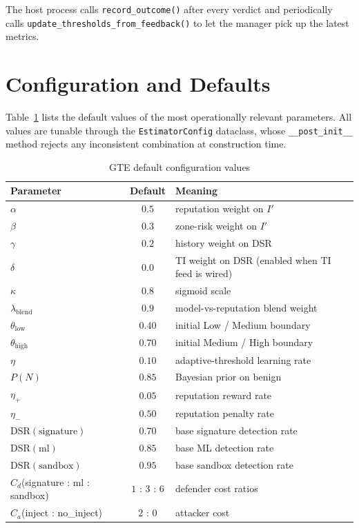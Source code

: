 \documentclass[12pt, a4paper]{report}
\begin{document}
The host process calls \texttt{record\_outcome()} after every verdict
and periodically calls \texttt{update\_thresholds\_from\_feedback()} to
let the manager pick up the latest metrics.

\section{Configuration and Defaults}
\label{sec:gte-config}

Table~\ref{tab:gte-defaults} lists the default values of the most
operationally relevant parameters. All values are tunable through the
\texttt{EstimatorConfig} dataclass, whose \texttt{\_\_post\_init\_\_}
method rejects any inconsistent combination at construction time.

\begin{table}[H]
\centering
\caption{GTE default configuration values}
\label{tab:gte-defaults}
\begin{tabular}{|p{5.2cm}|c|p{5.8cm}|}
\hline
\textbf{Parameter} & \textbf{Default} & \textbf{Meaning} \\
\hline
$\alpha$ & $0.5$ & reputation weight on $I'$ \\
\hline
$\beta$ & $0.3$ & zone-risk weight on $I'$ \\
\hline
$\gamma$ & $0.2$ & history weight on DSR \\
\hline
$\delta$ & $0.0$ & TI weight on DSR (enabled when TI feed is wired) \\
\hline
$\kappa$ & $0.8$ & sigmoid scale \\
\hline
$\lambda_{\text{blend}}$ & $0.9$ & model-vs-reputation blend weight \\
\hline
$\theta_{\text{low}}$ & $0.40$ & initial Low / Medium boundary \\
\hline
$\theta_{\text{high}}$ & $0.70$ & initial Medium / High boundary \\
\hline
$\eta$ & $0.10$ & adaptive-threshold learning rate \\
\hline
$P(N)$ & $0.85$ & Bayesian prior on benign \\
\hline
$\eta_+$ & $0.05$ & reputation reward rate \\
\hline
$\eta_-$ & $0.50$ & reputation penalty rate \\
\hline
$\mathrm{DSR}(\text{signature})$ & $0.70$ & base signature detection rate \\
\hline
$\mathrm{DSR}(\text{ml})$ & $0.85$ & base ML detection rate \\
\hline
$\mathrm{DSR}(\text{sandbox})$ & $0.95$ & base sandbox detection rate \\
\hline
$C_d$(signature : ml : sandbox) & $1$ : $3$ : $6$ & defender cost ratios \\
\hline
$C_a$(inject : no\_inject) & $2$ : $0$ & attacker cost \\
\hline
\end{tabular}
\end{table}
\end{document}
